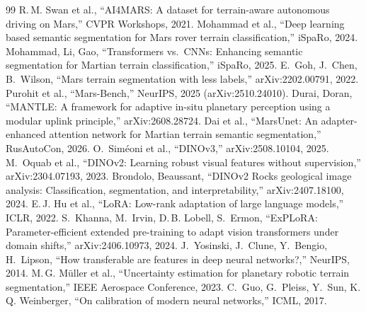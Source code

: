 \documentclass[conference]{IEEEtran}
\begin{document}
\begin{thebibliography}{99}\footnotesize
{} R.\,M. Swan et al., ``AI4MARS: A dataset for terrain-aware autonomous driving on Mars,'' CVPR Workshops, 2021.
 Mohammad et al., ``Deep learning based semantic segmentation for Mars rover terrain classification,'' iSpaRo, 2024.
 Mohammad, Li, Gao, ``Transformers vs.\ CNNs: Enhancing semantic segmentation for Martian terrain classification,'' iSpaRo, 2025.
 E.~Goh, J.~Chen, B.~Wilson, ``Mars terrain segmentation with less labels,'' arXiv:2202.00791, 2022.
 Purohit et al., ``Mars-Bench,'' NeurIPS, 2025 (arXiv:2510.24010).
 Durai, Doran, ``MANTLE: A framework for adaptive in-situ planetary perception using a modular uplink principle,'' arXiv:2608.28724.
 Dai et al., ``MarsUnet: An adapter-enhanced attention network for Martian terrain semantic segmentation,'' RusAutoCon, 2026.
 O.~Sim\'eoni et al., ``DINOv3,'' arXiv:2508.10104, 2025.
 M.~Oquab et al., ``DINOv2: Learning robust visual features without supervision,'' arXiv:2304.07193, 2023.
 Brondolo, Beaussant, ``DINOv2 Rocks geological image analysis: Classification, segmentation, and interpretability,'' arXiv:2407.18100, 2024.
 E.\,J. Hu et al., ``LoRA: Low-rank adaptation of large language models,'' ICLR, 2022.
 S.~Khanna, M.~Irvin, D.\,B. Lobell, S.~Ermon, ``ExPLoRA: Parameter-efficient extended pre-training to adapt vision transformers under domain shifts,'' arXiv:2406.10973, 2024.
 J.~Yosinski, J.~Clune, Y.~Bengio, H.~Lipson, ``How transferable are features in deep neural networks?,'' NeurIPS, 2014.
 M.\,G. M\"uller et al., ``Uncertainty estimation for planetary robotic terrain segmentation,'' IEEE Aerospace Conference, 2023.
 C.~Guo, G.~Pleiss, Y.~Sun, K.\,Q. Weinberger, ``On calibration of modern neural networks,'' ICML, 2017.
\end{thebibliography}
\end{document}
